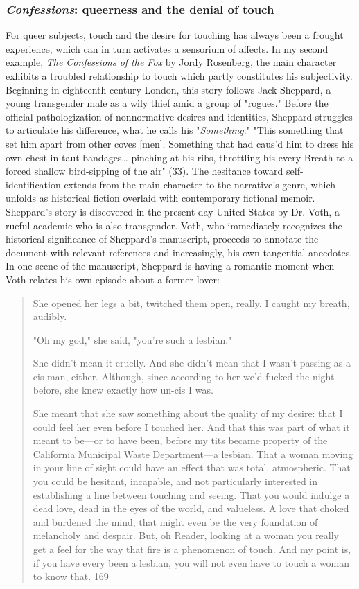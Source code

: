 \documentclass[11pt]{article}
\begin{document}
\subsubsection{\emph{Confessions}: queerness and the denial of touch}
\label{sec:org38f7132}
For queer subjects, touch and the desire for touching has always been
a frought experience, which can in turn activates a sensorium of
affects. In my second example, \emph{The Confessions of the Fox} by Jordy
Rosenberg, the main character exhibits a troubled relationship to
touch which partly constitutes his subjectivity. Beginning in
eighteenth century London, this story follows Jack Sheppard, a young
transgender male as a wily thief amid a group of "rogues."  Before the
official pathologization of nonnormative desires and identities,
Sheppard struggles to articulate his difference, what he calls his
"\emph{Something}:" "This something that set him apart from other coves
[men]. Something that had caus'd him to dress his own chest in taut
bandages\ldots{} pinching at his ribs, throttling his every Breath to a
forced shallow bird-sipping of the air" (33). The hesitance toward
self-identification extends from the main character to the narrative's
genre, which unfolds as historical fiction overlaid with contemporary
fictional memoir. Sheppard's story is discovered in the present day
United States by Dr. Voth, a rueful academic who is also
transgender. Voth, who immediately recognizes the historical
significance of Sheppard's manuscript, proceeds to annotate the
document with relevant references and increasingly, his own tangential
anecdotes. In one scene of the manuscript, Sheppard is having a
romantic moment when Voth relates his own episode about a former
lover:

\begin{quote}
She opened her legs a bit, twitched them open, really. I caught my
breath, audibly.

"Oh my god," she said, "you're such a lesbian."

She didn't mean it cruelly. And she didn't mean that I wasn't passing
as a cis-man, either. Although, since according to her we'd fucked the
night before, she knew exactly how un-cis I was. 

She meant that she saw something about the quality of my desire: that
I could feel her even before I touched her. And that this was part of
what it meant to be---or to have been, before my tits became property
of the California Municipal Waste Department---a lesbian. That a woman
moving in your line of sight could have an effect that was total,
atmospheric. That you could be hesitant, incapable, and not
particularly interested in establishing a line between touching and
seeing. That you would indulge a dead love, dead in the eyes of the
world, and valueless. A love that choked and burdened the mind, that
might even be the very foundation of melancholy and despair. But, oh
Reader, looking at a woman you really get a feel for the way that fire
is a phenomenon of touch. And my point is, if you have every been a
lesbian, you will not even have to touch a woman to know that. 169
\end{quote}
\end{document}
